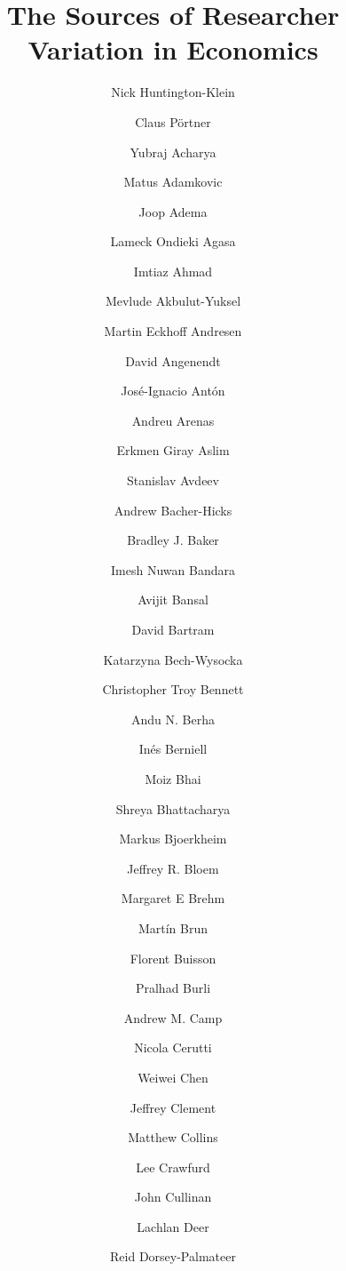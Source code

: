 \documentclass[
  number]{elsarticle}
\begin{document}
\begin{frontmatter}
\title{The Sources of Researcher Variation in Economics}
\author[1]{Nick Huntington-Klein%
%
}
\author[1]{Claus Pörtner%
%
}
\author[2]{Yubraj Acharya%
%
}
\author[3,4,5]{Matus Adamkovic%
%
}
\author[6]{Joop Adema%
%
}
\author[7]{Lameck Ondieki Agasa%
%
}
\author[8]{Imtiaz Ahmad%
%
}
\author[9]{Mevlude Akbulut-Yuksel%
%
}
\author[10]{Martin Eckhoff Andresen%
%
}
\author[11,12]{David Angenendt%
%
}
\author[13]{José-Ignacio Antón%
%
}
\author[14]{Andreu Arenas%
%
}
\author[15]{Erkmen Giray Aslim%
%
}
\author[16]{Stanislav Avdeev%
%
}
\author[17]{Andrew Bacher-Hicks%
%
}
\author[18]{Bradley J. Baker%
%
}
\author[19]{Imesh Nuwan Bandara%
%
}
\author[20]{Avijit Bansal%
%
}
\author[21]{David Bartram%
%
}
\author[22,23]{Katarzyna Bech-Wysocka%
%
}
\author[24]{Christopher Troy Bennett%
%
}
\author[25]{Andu N. Berha%
%
}
\author[26,27,28]{Inés Berniell%
%
}
\author[29,30]{Moiz Bhai%
%
}
\author[31]{Shreya Bhattacharya%
%
}
\author[32]{Markus Bjoerkheim%
%
}
\author[33]{Jeffrey R. Bloem%
%
}
\author[34]{Margaret E Brehm%
%
}
\author[35]{Martín Brun%
%
}
\author[36]{Florent Buisson%
%
}
\author[37]{Pralhad Burli%
%
}
\author[38]{Andrew M. Camp%
%
}
\author[39]{Nicola Cerutti%
%
}
\author[40]{Weiwei Chen%
%
}
\author[41]{Jeffrey Clement%
%
}
\author[42]{Matthew Collins%
%
}
\author[43]{Lee Crawfurd%
%
}
\author[44]{John Cullinan%
%
}
\author[45]{Lachlan Deer%
%
}
\author[46]{Reid Dorsey-Palmateer%
}
\end{frontmatter}
\end{document}
